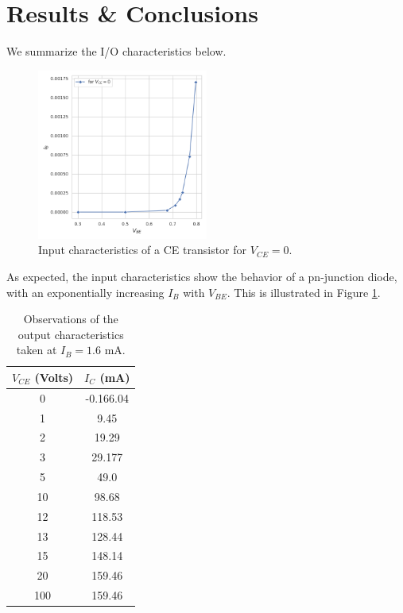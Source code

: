 \documentclass{article}
\begin{document}
	\section*{Results \& Conclusions}
	We summarize the I/O characteristics below.
	\pagebreak
	\begin{figure}[!h]
		\centering
		\includegraphics[width=0.5\textwidth]{input_chars}
		\caption{Input characteristics of a CE transistor for $V_{CE}=0$.}
		\label{fig:in}
	\end{figure}

	As expected, the input characteristics show the behavior of a pn-junction diode, with an exponentially increasing $I_B$ with $V_{BE}$. This is illustrated in Figure \ref{fig:in}.

	\begin{table}[!h]
		\centering
		\begin{tabular}{|c|c|}
			\hline
			$V_{CE}$ (Volts) & $I_C$  (mA) \\
			\hline
			0        & -0.166.04\\
			1        & 9.45    \\
			2        & 19.29   \\
			3        & 29.177  \\
			5        & 49.0    \\
			10       & 98.68   \\
			12       & 118.53  \\
			13       & 128.44  \\
			15       & 148.14  \\
			20       & 159.46  \\
			100      & 159.46 \\
			\hline
		\end{tabular}
		\caption{Observations of the output characteristics taken at $I_B = 1.6$ mA.}
	\end{table}
	
\end{document}
